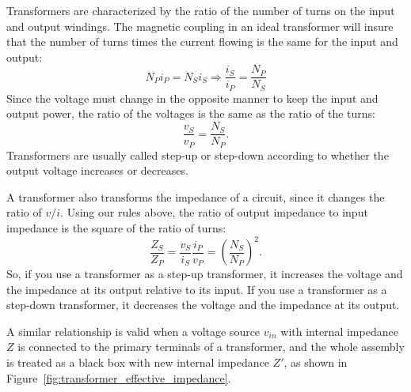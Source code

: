 \documentclass{article}
\begin{document}
Transformers are characterized by the ratio of the number of turns on the input and output windings. The magnetic coupling in an ideal transformer will insure that the number of turns times the current flowing is the same for the input and output:
\begin{equation}
N_P i_P = N_S i_S \Rightarrow \frac{i_S}{i_P} = \frac{N_P}{N_S}
\end{equation}
Since the voltage must change in the opposite manner to keep the input and output power, the ratio of the voltages is the same as the ratio of the turns:
\begin{equation}
\frac{v_S}{v_P} = \frac{N_S}{N_P}.
\end{equation}
Transformers are usually called step-up or step-down according to whether the output voltage increases or decreases.

A transformer also transforms the impedance of a circuit, since it changes the ratio of $v/i$. Using our rules above, the ratio of output impedance to input impedance is the square of the ratio of turns:
\begin{equation}
\frac{Z_S}{Z_P} = \frac{v_S}{i_S} \frac{i_P}{v_P} = \left(\frac{N_S}{N_P}\right)^2.
\end{equation}
So, if you use a transformer as a step-up transformer, it increases the voltage and the impedance at its output relative to its input. If you use a transformer as a step-down transformer, it decreases the voltage and the impedance at its output.

A similar relationship is valid when a voltage source $v_{in}$ with internal impedance $Z$ is connected to the primary terminals of a transformer, and the whole assembly is treated as a black box with new internal impedance $Z'$, as shown in Figure~\ref{fig:transformer_effective_impedance}.
\end{document}
